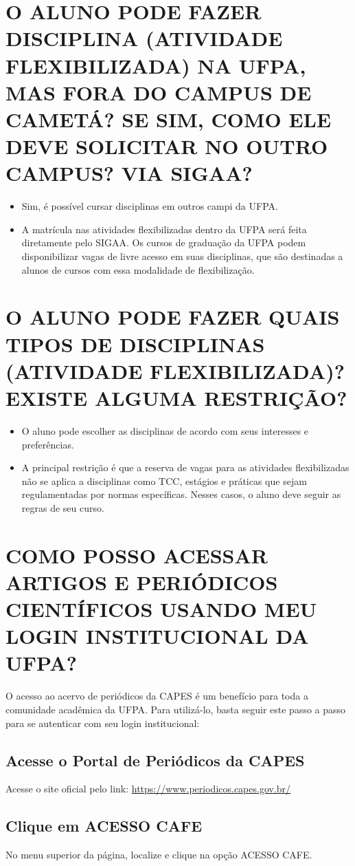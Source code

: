 \documentclass[12pt, a4paper]{article}
\begin{document}
\section{O ALUNO PODE FAZER DISCIPLINA (ATIVIDADE FLEXIBILIZADA) NA UFPA, MAS FORA DO CAMPUS DE CAMETÁ? SE SIM, COMO ELE DEVE SOLICITAR NO OUTRO CAMPUS? VIA SIGAA?}
\begin{itemize}
    \item Sim, é possível cursar disciplinas em outros campi da UFPA.
    \item A matrícula nas atividades flexibilizadas dentro da UFPA será feita diretamente pelo SIGAA. Os cursos de graduação da UFPA podem disponibilizar vagas de livre acesso em suas disciplinas, que são destinadas a alunos de cursos com essa modalidade de flexibilização.
\end{itemize}

\section{O ALUNO PODE FAZER QUAIS TIPOS DE DISCIPLINAS (ATIVIDADE FLEXIBILIZADA)? EXISTE ALGUMA RESTRIÇÃO?}
\begin{itemize}
    \item O aluno pode escolher as disciplinas de acordo com seus interesses e preferências.
    \item A principal restrição é que a reserva de vagas para as atividades flexibilizadas não se aplica a disciplinas como TCC, estágios e práticas que sejam regulamentadas por normas específicas. Nesses casos, o aluno deve seguir as regras de seu curso.
\end{itemize}

\section{COMO POSSO ACESSAR ARTIGOS E PERIÓDICOS CIENTÍFICOS USANDO MEU LOGIN INSTITUCIONAL DA UFPA?}
O acesso ao acervo de periódicos da CAPES é um benefício para toda a comunidade acadêmica da UFPA. Para utilizá-lo, basta seguir este passo a passo para se autenticar com seu login institucional:

\subsection{Acesse o Portal de Periódicos da CAPES}
Acesse o site oficial pelo link: \url{https://www.periodicos.capes.gov.br/}

\subsection{Clique em ACESSO CAFE}
No menu superior da página, localize e clique na opção ACESSO CAFE.
\end{document}
